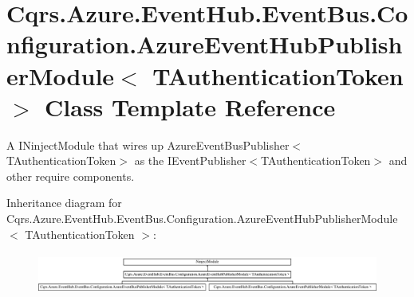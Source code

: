 \hypertarget{classCqrs_1_1Azure_1_1EventHub_1_1EventBus_1_1Configuration_1_1AzureEventHubPublisherModule}{}\section{Cqrs.\+Azure.\+Event\+Hub.\+Event\+Bus.\+Configuration.\+Azure\+Event\+Hub\+Publisher\+Module$<$ T\+Authentication\+Token $>$ Class Template Reference}
\label{classCqrs_1_1Azure_1_1EventHub_1_1EventBus_1_1Configuration_1_1AzureEventHubPublisherModule}


A I\+Ninject\+Module that wires up Azure\+Event\+Bus\+Publisher$<$\+T\+Authentication\+Token$>$ as the I\+Event\+Publisher$<$\+T\+Authentication\+Token$>$ and other require components.  


Inheritance diagram for Cqrs.\+Azure.\+Event\+Hub.\+Event\+Bus.\+Configuration.\+Azure\+Event\+Hub\+Publisher\+Module$<$ T\+Authentication\+Token $>$\+:\begin{figure}[H]
\begin{center}
\leavevmode
\includegraphics[height=1.370310cm]{classCqrs_1_1Azure_1_1EventHub_1_1EventBus_1_1Configuration_1_1AzureEventHubPublisherModule}
\end{center}
\end{figure}
